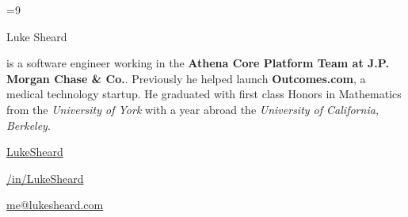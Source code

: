 \documentclass{article}
\newcommand{\social}[3]{
   	#1
   	\hspace{10pt}
	\href{#2}{#3}
}
\begin{document}
\color{body}

=9\relax     %

\raggedright

\fontsize{10pt}{13pt}\selectfont


{\Huge Luke Sheard}

\vspace{10pt}

is a software engineer working in the \textbf{Athena Core Platform Team at J.P. Morgan Chase \& Co.}. Previously he helped launch \textbf{Outcomes.com}, a medical technology startup. He graduated with first class Honors in Mathematics from the \textit{University of York} with a year abroad the \textit{University of California, Berkeley}.

\vspace{5pt}

\social{\faGithub}{https://www.github.com/LukeSheard}{LukeSheard}
\social{\faLinkedin}{https://www.linkedin.com/in/lukesheard}{/in/LukeSheard}
\social{\faEnvelope}{mailto:me@lukesheard.com}{me@lukesheard.com}

\vspace{15pt}
\end{document}
